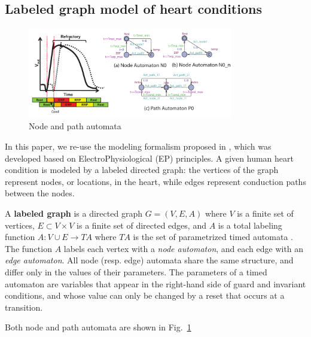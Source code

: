 \subsection{Labeled graph model of heart conditions}
\label{labeledGraph}

\begin{figure}[!t]
	\centering
	\includegraphics[width=0.8\textwidth]{figs/init_abs.pdf}
	\caption{\small Node and path automata}
	\label{fig:nodepathTA}
\end{figure}
In this paper, we re-use the modeling formalism proposed in \cite{VHM_proc}, which was developed based on ElectroPhysiological (EP) principles.
A given human heart condition is modeled by a labeled directed graph: the vertices of the graph represent nodes, or locations, in the heart, while edges represent conduction paths between the nodes. 
\begin{defn}
	A \textbf{labeled graph} is a directed graph $G = (V,E,A)$ where 
	$V$ is a finite set of vertices, $E \subset V\times V$ is a finite set of directed edges,
	and $A$ is a total labeling function $A: V \cup E \rightarrow TA$
	where $TA$ is the set of parametrized timed automata \cite{timed_automata}.
	The function $A$ labels each vertex with a \emph{node automaton}, and each edge with an \emph{edge automaton}.
	All node (resp. edge) automata share the same structure, and differ only in the values of their parameters.
	The parameters of a timed automaton are variables that appear in the right-hand side of guard and invariant conditions, and whose value can only be changed by a reset that occurs at a transition.
		
	Both node and path automata are shown in Fig.~\ref{fig:nodepathTA}
\end{defn}


